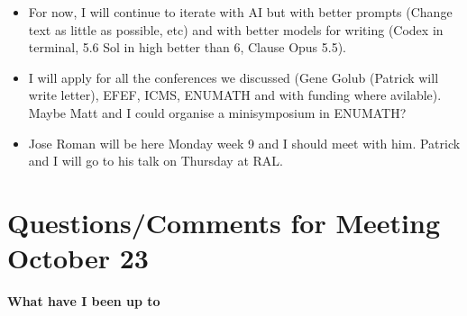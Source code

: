 \documentclass[12pt,a4paper]{article}
\begin{document}
\begin{itemize}
    \item For now, I will continue to iterate with AI but with better prompts (Change text as little as possible, etc) and with better models for writing (Codex in terminal, 5.6 Sol in high better than 6, Clause Opus 5.5). 
    \item I will apply for all the conferences we discussed (Gene Golub (Patrick will write letter), EFEF, ICMS, ENUMATH and with funding where avilable). Maybe Matt and I could organise a minisymposium in ENUMATH? 
    \item Jose Roman will be here Monday week 9 and I should meet with him. Patrick and I will go to his talk on Thursday at RAL. 
\end{itemize}


\section{Questions/Comments for Meeting October 23}

\textbf{What have I been up to}
\end{document}
